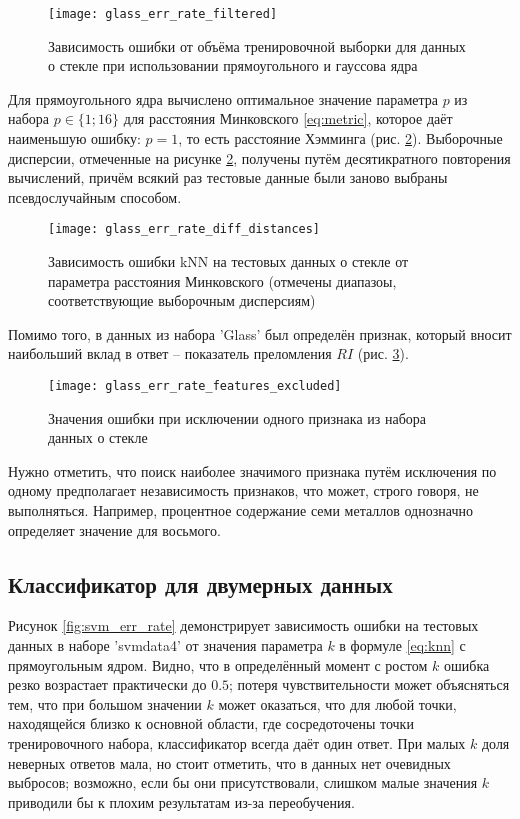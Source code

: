 \documentclass[a4paper,12pt]{article} %
\newcommand{\myPictWidth}{.95\textwidth}
\begin{document}
\begin{figure}[h!]
    \centering \texttt{[image: glass\_err\_rate\_filtered]}
    \caption{Зависимость ошибки от объёма тренировочной выборки для данных о стекле при использовании прямоугольного и гауссова ядра}
    \label{fig:glass_err_rate_filtered}
\end{figure}

Для прямоугольного ядра вычислено оптимальное значение параметра $p$ из набора $p \in \{1;16\}$ для расстояния Минковского \eqref{eq:metric}, которое даёт наименьшую ошибку: $p=1$, то есть расстояние Хэмминга (рис. \ref{fig:glass_err_rate_distances}). Выборочные дисперсии, отмеченные на рисунке \ref{fig:glass_err_rate_distances}, получены путём десятикратного повторения вычислений, причём всякий раз тестовые данные были заново выбраны псевдослучайным способом.

\begin{figure}[H]
    \centering \texttt{[image: glass\_err\_rate\_diff\_distances]}
    \caption{Зависимость ошибки kNN на тестовых данных о стекле от параметра расстояния Минковского (отмечены диапазоы, соответствующие выборочным дисперсиям)}
    \label{fig:glass_err_rate_distances}
\end{figure}

Помимо того, в данных из набора 'Glass' был определён признак, который вносит наибольший вклад в ответ -- показатель преломления $RI$ (рис. \ref{fig:glass_err_rate_features}).

\begin{figure}[H]
    \centering \texttt{[image: glass\_err\_rate\_features\_excluded]}
    \caption{Значения ошибки при исключении одного признака из набора данных о стекле }
    \label{fig:glass_err_rate_features}
\end{figure}

Нужно отметить, что поиск наиболее значимого признака путём исключения по одному предполагает независимость признаков, что может, строго говоря, не выполняться.
Например, процентное содержание семи металлов однозначно определяет значение для восьмого.

\newpage
\subsection{Классификатор для двумерных данных}

Рисунок \ref{fig:svm_err_rate} демонстрирует зависимость ошибки на тестовых данных в наборе 'svmdata4' от значения параметра $k$ в формуле \eqref{eq:knn} с прямоугольным ядром.
Видно, что в определённый момент с ростом $k$ ошибка резко возрастает практически до $0.5$; потеря чувствительности может объясняться тем, что при большом значении $k$ может оказаться, что для любой точки, находящейся близко к основной области, где сосредоточены точки тренировочного набора, классификатор всегда даёт один ответ.
При малых $k$ доля неверных ответов мала, но стоит отметить, что в данных нет очевидных выбросов; возможно, если бы они присутствовали, слишком малые значения $ k $ приводили бы к плохим результатам из-за переобучения.
\end{document}
